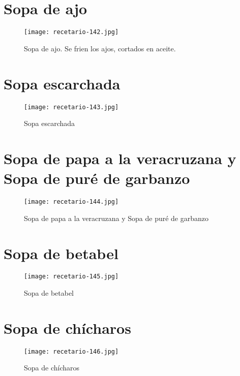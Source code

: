 \documentclass[12pt,letterpaper]{article}
\begin{document}
\section{Sopa de ajo}
  \begin{figure}[H]
    \vspace{2pt}
  \texttt{[image: recetario-142.jpg]}
    \caption{Sopa de ajo. Se frien los ajos, cortados en aceite.}
    
  \end{figure}

\newpage

\section{Sopa escarchada}
  \begin{figure}[H]
    \vspace{2pt}
  \texttt{[image: recetario-143.jpg]}
    \caption{Sopa escarchada}
    
  \end{figure}

\newpage

\section{Sopa de papa a la veracruzana y Sopa de puré de garbanzo}
  \begin{figure}[H]
    \vspace{2pt}
  \texttt{[image: recetario-144.jpg]}
    \caption{Sopa de papa a la veracruzana y Sopa de puré de garbanzo}
    
  \end{figure}

\newpage

\section{Sopa de betabel}
  \begin{figure}[H]
    \vspace{2pt}
  \texttt{[image: recetario-145.jpg]}
    \caption{Sopa de betabel}
    
  \end{figure}


\newpage

\section{Sopa de chícharos}
  \begin{figure}[H]
    \vspace{2pt}
  \texttt{[image: recetario-146.jpg]}
    \caption{Sopa de chícharos}
    
  \end{figure}
\end{document}
